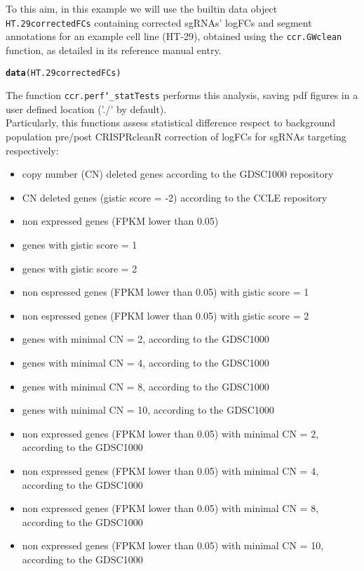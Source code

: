 \documentclass{article}\usepackage[]{graphicx}\usepackage[]{color}
\makeatletter
\newcommand{\hlstd}[1]{\textcolor[rgb]{0.345,0.345,0.345}{#1}}%
\newcommand{\hlkwd}[1]{\textcolor[rgb]{0.737,0.353,0.396}{\textbf{#1}}}%
\newenvironment{kframe}{%
 \def\at@end@of@kframe{}%
 \ifinner\ifhmode%
  \def\at@end@of@kframe{\end{minipage}}%
  \begin{minipage}{\columnwidth}%
 \fi\fi%
 \def\FrameCommand##1{\hskip\@totalleftmargin \hskip-\fboxsep
 \colorbox{shadecolor}{##1}\hskip-\fboxsep
     \hskip-\linewidth \hskip-\@totalleftmargin \hskip\columnwidth}%
 \MakeFramed {\advance\hsize-\width
   \@totalleftmargin\z@ \linewidth\hsize
   \@setminipage}}%
 {\par\unskip\endMakeFramed%
 \at@end@of@kframe}
\newenvironment{knitrout}{}{} %
\makeatother
\begin{document}
To this aim, in this example we will use the builtin data object\\ \texttt{HT.29correctedFCs} containing corrected sgRNAs' logFCs and segment annotations for an example cell line (HT-29), obtained using the \texttt{ccr.GWclean} function, as detailed in its reference manual entry.

\begin{knitrout}
\color{fgcolor}\begin{kframe}
\begin{alltt}
\hlkwd{data}\hlstd{(HT.29correctedFCs)}
\end{alltt}
\end{kframe}
\end{knitrout}

The function \texttt{ccr.perf\char`_statTests} performs this analysis, saving pdf figures in a user defined location ('./' by default).\\

Particularly, this functions assess statistical difference respect to background population pre/post CRISPRcleanR correction of logFCs for sgRNAs targeting respectively:

\begin{itemize}
        \item copy number (CN) deleted genes according to the GDSC1000 repository
        \item CN deleted genes (gistic score = -2) according to the CCLE repository
        \item non expressed genes (FPKM lower than 0.05)
        \item genes with gistic score = 1
        \item genes with gistic score = 2
        \item non espressed genes (FPKM lower than 0.05) with gistic score = 1
        \item non espressed genes (FPKM lower than 0.05) with gistic score = 2
        \item genes with minimal CN = 2, according to the GDSC1000
        \item genes with minimal CN = 4, according to the GDSC1000
        \item genes with minimal CN = 8, according to the GDSC1000
        \item genes with minimal CN = 10, according to the GDSC1000
        \item non expressed genes (FPKM lower than 0.05) with minimal CN = 2, according to the GDSC1000
        \item non expressed genes (FPKM lower than 0.05) with minimal CN = 4, according to the GDSC1000
        \item non expressed genes (FPKM lower than 0.05) with minimal CN = 8, according to the GDSC1000
        \item non expressed genes (FPKM lower than 0.05) with minimal CN = 10, according to the GDSC1000

        \end{itemize}
\end{document}
